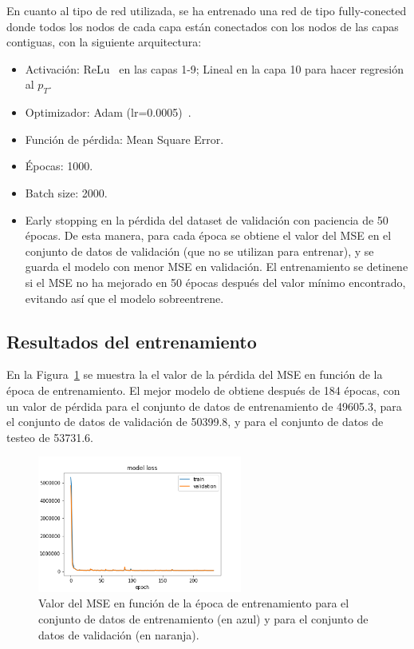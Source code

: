En cuanto al tipo de red utilizada, se ha entrenado una red de tipo fully-conected donde todos los nodos de cada capa est\'an conectados con los nodos de las capas contiguas, con la siguiente arquitectura:


\begin{itemize}

\item Activaci\'on: ReLu~\cite{agarap2018deep} en las capas 1-9; Lineal en la capa 10 para hacer regresi\'on al $p_{T}$.

\item Optimizador: Adam (lr=0.0005)~\cite{Kingma2015AdamAM}.

\item Funci\'on de p\'erdida: Mean Square Error.

\item \'Epocas: 1000.

\item Batch size: 2000.

\item Early stopping en la p\'erdida del dataset de validaci\'on con paciencia de 50 \'epocas. De esta manera, para cada \'epoca se obtiene el valor del MSE en el conjunto de datos de validaci\'on (que no se utilizan para entrenar), y se guarda el modelo con menor MSE en validaci\'on. El entrenamiento se detinene si el MSE no ha mejorado en 50 \'epocas despu\'es del valor m\'inimo encontrado, evitando as\'i que el modelo sobreentrene.

\end{itemize}


\subsection{Resultados del entrenamiento}\label{sec:trainresults}

En la Figura~\ref{fig:model_loss} se muestra la el valor de la p\'erdida del MSE en funci\'on de la \'epoca de entrenamiento. El mejor modelo de obtiene despu\'es de 184 \'epocas, con un valor de p\'erdida para el conjunto de datos de entrenamiento de 49605.3, para el conjunto de datos de validaci\'on de 50399.8, y para el conjunto de datos de testeo de 53731.6.  \\

\begin{figure}[h]
\centering
\includegraphics[width=0.6\textwidth]{figures/model_loss.png}
\caption{Valor del MSE en funci\'on de la \'epoca de entrenamiento para el conjunto de datos de entrenamiento (en azul) y para el conjunto de datos de validaci\'on (en naranja).}
\label{fig:model_loss}        
\end{figure}


